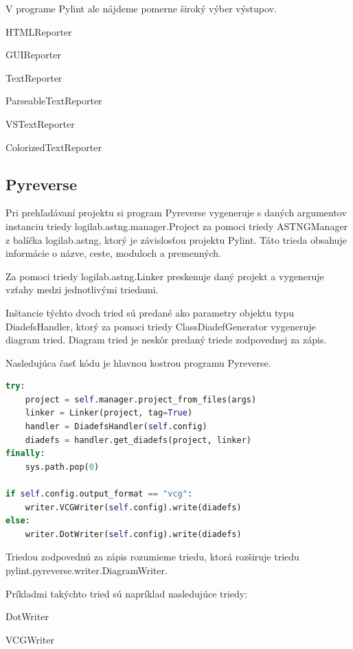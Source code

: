 \documentclass[11pt,oneside,final]{fithesis2}
\begin{document}
\begin{list}{•}{}
		V programe Pylint ale nájdeme pomerne široký výber výstupov.
		
			    \begin{list}{•}{}
					\item HTMLReporter
					\item GUIReporter
					\item TextReporter
					\item ParseableTextReporter
					\item VSTextReporter
					\item ColorizedTextReporter
    			\end{list}
		
    \end{list}
		
	\subsection{Pyreverse}
	Pri prehľadávaní projektu si program Pyreverse vygeneruje s daných argumentov instanciu triedy logilab.astng.manager.Project za pomoci triedy ASTNGManager z balíčka logilab.astng, ktorý je závislosťou projektu Pylint.
	Táto trieda obsahuje informácie o názve, ceste, moduloch a premenných.
	
		Za pomoci triedy logilab.astng.Linker preskenuje daný projekt a vygeneruje vzťahy medzi jednotlivými triedami.
	
		Inštancie týchto dvoch tried sú predané ako parametry objektu typu DiadefsHandler, ktorý za pomoci triedy ClassDiadefGenerator vygeneruje diagram tried. Diagram tried je neskôr predaný triede zodpovednej za zápis.
		
		Nasledujúca časť kódu je hlavnou kostrou programu Pyreverse.
		
\begin{lstlisting}[language=python]	
try:
    project = self.manager.project_from_files(args)
    linker = Linker(project, tag=True)
    handler = DiadefsHandler(self.config)
    diadefs = handler.get_diadefs(project, linker)
finally:
    sys.path.pop(0)

if self.config.output_format == "vcg":
	writer.VCGWriter(self.config).write(diadefs)
else:
    writer.DotWriter(self.config).write(diadefs)
\end{lstlisting}
		
		
		Triedou zodpovednú za zápis rozumieme triedu, ktorá rozširuje triedu pylint.pyreverse.writer.DiagramWriter.
		
			Príkladmi takýchto tried sú napríklad nasledujúce triedy:
			    \begin{list}{•}{}
					\item DotWriter
					\item VCGWriter
    			\end{list}
    			
\end{document}
